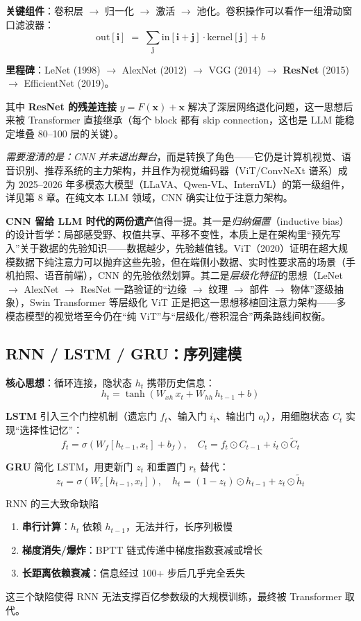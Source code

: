 \documentclass[12pt,a4paper]{article}
\begin{document}
\textbf{关键组件}：卷积层 $\to$ 归一化 $\to$ 激活 $\to$ 池化。卷积操作可以看作一组滑动窗口滤波器：
\[
\text{out}[\mathbf{i}] \;=\; \sum_{\mathbf{j}} \text{in}[\mathbf{i}+\mathbf{j}] \cdot \text{kernel}[\mathbf{j}] + b
\]

\textbf{里程碑}：LeNet (1998) $\to$ AlexNet (2012) $\to$ VGG (2014) $\to$ \textbf{ResNet} (2015) $\to$ EfficientNet (2019)。

其中 \textbf{ResNet 的残差连接} $y = F(\mathbf{x}) + \mathbf{x}$ 解决了深层网络退化问题，这一思想后来被 Transformer 直接继承（每个 block 都有 skip connection，这也是 LLM 能稳定堆叠 80--100 层的关键）。

\emph{需要澄清的是：CNN 并未退出舞台}，而是转换了角色——它仍是计算机视觉、语音识别、推荐系统的主力架构，并且作为视觉编码器（ViT/ConvNeXt 谱系）成为 2025--2026 年多模态大模型（LLaVA、Qwen-VL、InternVL）的第一级组件，详见第 8 章。在纯文本 LLM 领域，CNN 确实让位于注意力架构。

\textbf{CNN 留给 LLM 时代的两份遗产}值得一提。其一是\emph{归纳偏置}（inductive bias）的设计哲学：局部感受野、权值共享、平移不变性，本质上是在架构里“预先写入”关于数据的先验知识——数据越少，先验越值钱。ViT（2020）证明在超大规模数据下纯注意力可以抛弃这些先验，但在端侧小数据、实时性要求高的场景（手机拍照、语音前端），CNN 的先验依然划算。其二是\emph{层级化特征}的思想（LeNet $\to$ AlexNet $\to$ ResNet 一路验证的“边缘 $\to$ 纹理 $\to$ 部件 $\to$ 物体”逐级抽象），Swin Transformer 等层级化 ViT 正是把这一思想移植回注意力架构——多模态模型的视觉塔至今仍在“纯 ViT”与“层级化/卷积混合”两条路线间权衡。
\subsection{RNN / LSTM / GRU：序列建模}
\textbf{核心思想}：循环连接，隐状态 $h_t$ 携带历史信息：
\[
h_t = \tanh(W_{xh}\, x_t + W_{hh}\, h_{t-1} + b)
\]

\textbf{LSTM} 引入三个门控机制（遗忘门 $f_t$、输入门 $i_t$、输出门 $o_t$），用细胞状态 $C_t$ 实现“选择性记忆”：
\[
f_t = \sigma(W_f [h_{t-1}, x_t] + b_f), \quad
C_t = f_t \odot C_{t-1} + i_t \odot \tilde{C}_t
\]

\textbf{GRU} 简化 LSTM，用更新门 $z_t$ 和重置门 $r_t$ 替代：
\[
z_t = \sigma(W_z [h_{t-1}, x_t]), \quad
h_t = (1-z_t) \odot h_{t-1} + z_t \odot \tilde{h}_t
\]

\begin{warnbox}{RNN 的三大致命缺陷}
\begin{enumerate}
  \item \textbf{串行计算}：$h_t$ 依赖 $h_{t-1}$，无法并行，长序列极慢
  \item \textbf{梯度消失/爆炸}：BPTT 链式传递中梯度指数衰减或增长
  \item \textbf{长距离依赖衰减}：信息经过 100+ 步后几乎完全丢失
\end{enumerate}
这三个缺陷使得 RNN 无法支撑百亿参数级的大规模训练，最终被 Transformer 取代。
\end{warnbox}
\end{document}
